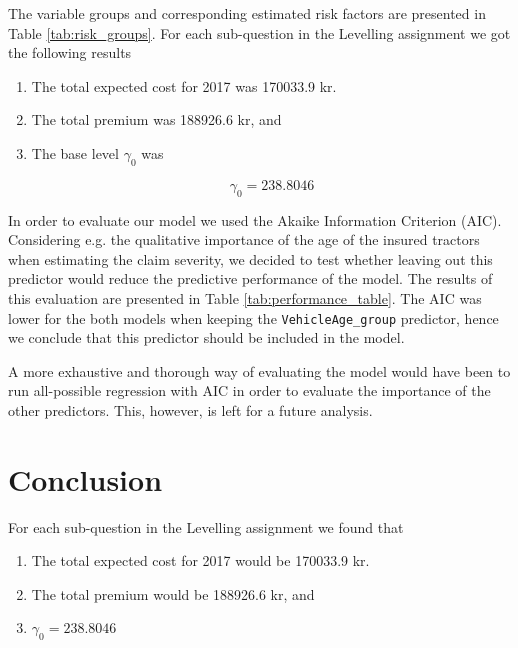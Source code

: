 \documentclass[11pt]{article}
\begin{document}
The variable groups and corresponding estimated risk factors are presented in Table \ref{tab:risk_groups}.
For each sub-question in the Levelling assignment we got the following results

\begin{enumerate}
\item The total expected cost for 2017 was 170033.9 kr.
\item The total premium was 188926.6 kr, and
\item The base level \(\gamma_0\) was

\[
     \gamma_0 = 238.8046
     \]
\end{enumerate}

In order to evaluate our model we used the Akaike Information Criterion (AIC). Considering e.g. 
the qualitative importance of the age of the insured tractors when estimating the claim severity, we decided to test 
whether leaving out this predictor would reduce the predictive performance of the model. The results 
of this evaluation are presented in Table \ref{tab:performance_table}. The AIC was lower for the both models 
when keeping the \texttt{VehicleAge\_group} predictor, hence we conclude that this predictor should be included in
the model.

A more exhaustive and thorough way of evaluating the model would have been to run all-possible regression 
with AIC in order to evaluate the importance of the other predictors. This, however, is left 
for a future analysis.





\section{Conclusion}
\label{sec:org6cf4de3}

For each sub-question in the Levelling assignment we found that

\begin{enumerate}
\item The total expected cost for 2017 would be 170033.9 kr.
\item The total premium would be 188926.6 kr, and
\item \(\gamma_0 = 238.8046\)
\end{enumerate}
\end{document}
